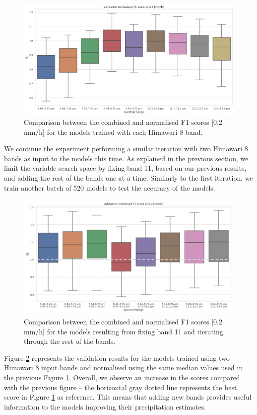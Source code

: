 \documentclass[3p,times]{elsarticle}
\begin{document}
\begin{figure}%
    \includegraphics[width=14cm]{figure2.png}
    \caption{Comparison between the combined and normalised F1 scores [0.2 mm/h] for the models trained with each Himawari 8 band.}%
    \label{experiment_1b}%
\end{figure}

We continue the experiment performing a similar iteration with two Himawari 8 bands as input to the models this time. As explained in the previous section, we limit the variable search space by fixing band 11, based on our previous results, and adding the rest of the bands one at a time. Similarly to the first iteration, we train another batch of 520 models to test the accuracy of the models.

\begin{figure}%
    \includegraphics[width=14cm]{figure3.png}
    \caption{Comparison between the combined and normalised F1 scores [0.2 mm/h] for the models resulting from fixing band 11 and iterating through the rest of the bands.}%
    \label{experiment_2}%
\end{figure}

Figure \ref{experiment_2} represents the validation results for the models trained using two Himawari 8 input bands and normalised using the same median values used in the previous Figure \ref{experiment_1b}. Overall, we observe an increase in the scores compared with the previous figure -- the horizontal gray dotted line represents the best score in Figure \ref{experiment_1b} as reference. This means that adding new bands provides useful information to the models improving their precipitation estimates. 
\end{document}
